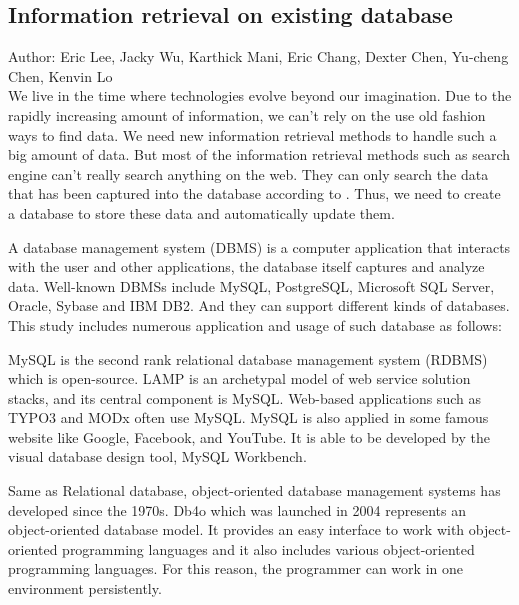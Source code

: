 	
\subsection{Information retrieval on existing database}
Author: Eric Lee, Jacky Wu, Karthick Mani, Eric Chang, Dexter Chen, Yu-cheng Chen, Kenvin Lo\\

We live in the time where technologies evolve beyond our imagination. Due to the rapidly increasing amount of information, we can't rely on the use old fashion ways to find data. We need new information retrieval methods to handle such a big amount of data. But most of the information retrieval methods such as search engine can't really search anything on the web. They can only search the data that has been captured into the database according to \cite{Grehan}. Thus, we need to create a database to store these data and automatically update them.

A database management system (DBMS) is a computer application that interacts with the user and other applications, the database itself captures and analyze data. Well-known DBMSs include MySQL, PostgreSQL, Microsoft SQL Server, Oracle, Sybase and IBM DB2. And they can support different kinds of databases. This study includes numerous application and usage of such database as follows:

MySQL is the second rank relational database management system (RDBMS) which is open-source. LAMP is an archetypal model of web service solution stacks, and its central component is MySQL. Web-based applications such as TYPO3 and MODx often use MySQL. MySQL is also applied in some famous website like Google, Facebook, and YouTube. It is able to be developed by the visual database design tool, MySQL Workbench.

Same as Relational database, object-oriented database management systems has developed since the 1970s. Db4o which was launched in 2004 represents an object-oriented database model. It provides an easy interface to work with object-oriented programming languages and it also includes various object-oriented programming languages. For this reason, the programmer can work in one environment persistently.

